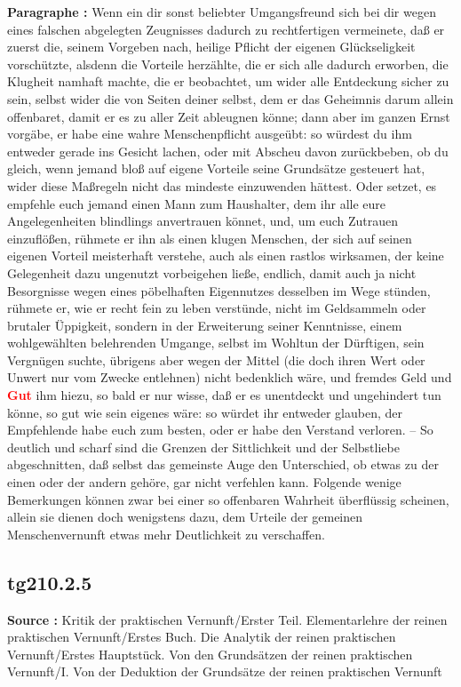 \documentclass[a4paper,12pt,twoside]{book}
\newcommand{\match}[1]{\textcolor{red}{\textbf{#1}}}
\begin{document}
	\noindent\textbf{Paragraphe : }Wenn ein dir sonst beliebter Umgangsfreund sich bei dir wegen eines falschen abgelegten Zeugnisses dadurch zu rechtfertigen vermeinete, daß er zuerst die, seinem Vorgeben nach, heilige Pflicht der eigenen Glückseligkeit vorschützte, alsdenn die Vorteile herzählte, die er sich alle dadurch erworben, die Klugheit namhaft machte, die er beobachtet, um wider alle Entdeckung sicher zu sein, selbst wider die von Seiten deiner selbst, dem er das Geheimnis darum allein offenbaret, damit er es zu aller Zeit ableugnen könne; dann aber im ganzen Ernst vorgäbe, er habe eine wahre Menschenpflicht ausgeübt: so würdest du ihm entweder gerade ins Gesicht lachen, oder mit Abscheu davon zurückbeben, ob du gleich, wenn jemand bloß auf eigene Vorteile seine Grundsätze gesteuert hat, wider diese Maßregeln nicht das mindeste einzuwenden hättest. Oder setzet, es empfehle euch jemand einen Mann zum Haushalter, dem ihr alle eure Angelegenheiten blindlings anvertrauen könnet, und, um euch Zutrauen einzuflößen, rühmete er ihn als einen klugen Menschen, der sich auf seinen eigenen Vorteil meisterhaft verstehe, auch als einen rastlos wirksamen, der keine Gelegenheit dazu ungenutzt vorbeigehen ließe, endlich, damit auch ja nicht Besorgnisse wegen eines pöbelhaften Eigennutzes desselben im Wege stünden, rühmete er, wie er recht fein zu leben verstünde, nicht im Geldsammeln oder brutaler Üppigkeit, sondern in der Erweiterung seiner Kenntnisse, einem wohlgewählten belehrenden Umgange, selbst im Wohltun der Dürftigen, sein Vergnügen suchte, übrigens aber wegen der Mittel (die doch ihren Wert oder Unwert nur vom Zwecke entlehnen) nicht bedenklich wäre, und fremdes Geld und \match{Gut} ihm hiezu, so bald er nur wisse,  daß er es unentdeckt und ungehindert tun könne, so gut wie sein eigenes wäre: so würdet ihr entweder glauben, der Empfehlende habe euch zum besten, oder er habe den Verstand verloren. – So deutlich und scharf sind die Grenzen der Sittlichkeit und der Selbstliebe abgeschnitten, daß selbst das gemeinste Auge den Unterschied, ob etwas zu der einen oder der andern gehöre, gar nicht verfehlen kann. Folgende wenige Bemerkungen können zwar bei einer so offenbaren Wahrheit überflüssig scheinen, allein sie dienen doch wenigstens dazu, dem Urteile der gemeinen Menschenvernunft etwas mehr Deutlichkeit zu verschaffen. 
	
	\subsection*{tg210.2.5} 
	\textbf{Source : }Kritik der praktischen Vernunft/Erster Teil. Elementarlehre der reinen praktischen Vernunft/Erstes Buch. Die Analytik der reinen praktischen Vernunft/Erstes Hauptstück. Von den Grundsätzen der reinen praktischen Vernunft/I. Von der Deduktion der Grundsätze der reinen praktischen Vernunft\\  
	
\end{document}
